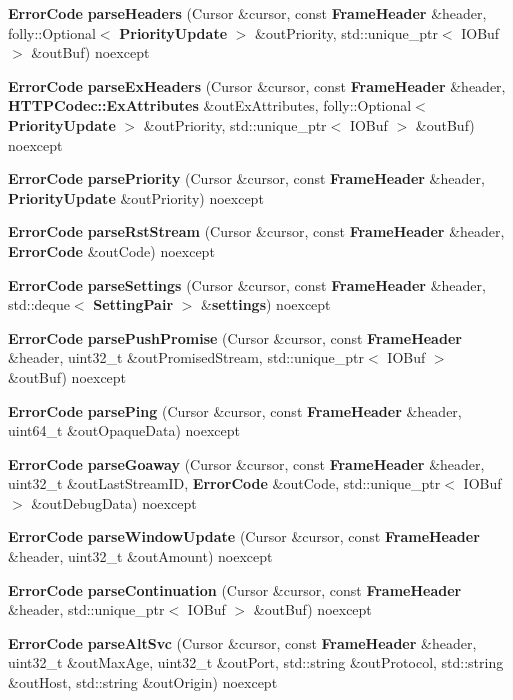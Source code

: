 \begin{DoxyCompactItemize}
\item 
{\bf Error\+Code} {\bf parse\+Headers} (Cursor \&cursor, const {\bf Frame\+Header} \&header, folly\+::\+Optional$<$ {\bf Priority\+Update} $>$ \&out\+Priority, std\+::unique\+\_\+ptr$<$ I\+O\+Buf $>$ \&out\+Buf) noexcept
\item 
{\bf Error\+Code} {\bf parse\+Ex\+Headers} (Cursor \&cursor, const {\bf Frame\+Header} \&header, {\bf H\+T\+T\+P\+Codec\+::\+Ex\+Attributes} \&out\+Ex\+Attributes, folly\+::\+Optional$<$ {\bf Priority\+Update} $>$ \&out\+Priority, std\+::unique\+\_\+ptr$<$ I\+O\+Buf $>$ \&out\+Buf) noexcept
\item 
{\bf Error\+Code} {\bf parse\+Priority} (Cursor \&cursor, const {\bf Frame\+Header} \&header, {\bf Priority\+Update} \&out\+Priority) noexcept
\item 
{\bf Error\+Code} {\bf parse\+Rst\+Stream} (Cursor \&cursor, const {\bf Frame\+Header} \&header, {\bf Error\+Code} \&out\+Code) noexcept
\item 
{\bf Error\+Code} {\bf parse\+Settings} (Cursor \&cursor, const {\bf Frame\+Header} \&header, std\+::deque$<$ {\bf Setting\+Pair} $>$ \&{\bf settings}) noexcept
\item 
{\bf Error\+Code} {\bf parse\+Push\+Promise} (Cursor \&cursor, const {\bf Frame\+Header} \&header, uint32\+\_\+t \&out\+Promised\+Stream, std\+::unique\+\_\+ptr$<$ I\+O\+Buf $>$ \&out\+Buf) noexcept
\item 
{\bf Error\+Code} {\bf parse\+Ping} (Cursor \&cursor, const {\bf Frame\+Header} \&header, uint64\+\_\+t \&out\+Opaque\+Data) noexcept
\item 
{\bf Error\+Code} {\bf parse\+Goaway} (Cursor \&cursor, const {\bf Frame\+Header} \&header, uint32\+\_\+t \&out\+Last\+Stream\+ID, {\bf Error\+Code} \&out\+Code, std\+::unique\+\_\+ptr$<$ I\+O\+Buf $>$ \&out\+Debug\+Data) noexcept
\item 
{\bf Error\+Code} {\bf parse\+Window\+Update} (Cursor \&cursor, const {\bf Frame\+Header} \&header, uint32\+\_\+t \&out\+Amount) noexcept
\item 
{\bf Error\+Code} {\bf parse\+Continuation} (Cursor \&cursor, const {\bf Frame\+Header} \&header, std\+::unique\+\_\+ptr$<$ I\+O\+Buf $>$ \&out\+Buf) noexcept
\item 
{\bf Error\+Code} {\bf parse\+Alt\+Svc} (Cursor \&cursor, const {\bf Frame\+Header} \&header, uint32\+\_\+t \&out\+Max\+Age, uint32\+\_\+t \&out\+Port, std\+::string \&out\+Protocol, std\+::string \&out\+Host, std\+::string \&out\+Origin) noexcept
\item 

\end{DoxyCompactItemize}
